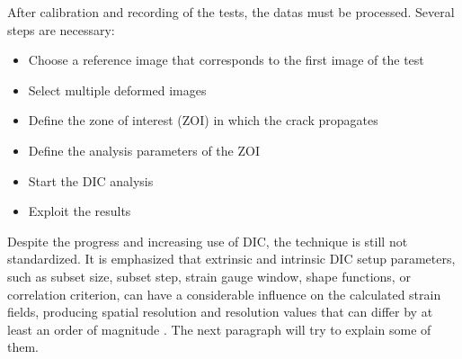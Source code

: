 After calibration and recording of the tests, the datas must be processed. Several steps are necessary:

\begin{itemize}
	\item Choose a reference image that corresponds to the first image of the test 
	\item Select multiple deformed images
	\item Define the zone of interest (ZOI) in which the crack propagates
	\item Define the analysis parameters of the ZOI
	\item Start the DIC analysis
	\item Exploit the results
\end{itemize}

Despite the progress and increasing use of DIC, the technique is still not standardized. It is emphasized that extrinsic and intrinsic DIC setup parameters, such as subset size, subset step, strain gauge window, shape functions, or correlation criterion, can have a considerable influence on the calculated strain fields, producing spatial resolution and resolution values that can differ by at least an order of magnitude \cite{DICguide2018}. The next paragraph will try to explain some of them. 


